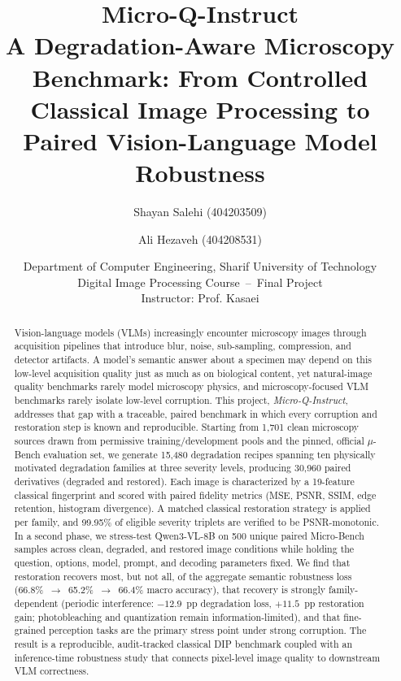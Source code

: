 \documentclass[11pt]{article}
\title{\vspace{-1.5cm}\textbf{\color{navy}Micro-Q-Instruct}\\[0.3em]
\large A Degradation-Aware Microscopy Benchmark: From Controlled Classical Image Processing to Paired Vision-Language Model Robustness}
\author{Shayan Salehi (404203509) \and Ali Hezaveh (404208531)}
\date{Department of Computer Engineering, Sharif University of Technology\\
Digital Image Processing Course \,--\, Final Project\\
Instructor: Prof. Kasaei}
\begin{document}
\maketitle
\thispagestyle{fancy}

\begin{abstract}
\noindent
Vision-language models (VLMs) increasingly encounter microscopy images through
acquisition pipelines that introduce blur, noise, sub-sampling, compression, and
detector artifacts. A model's semantic answer about a specimen may depend on this
low-level acquisition quality just as much as on biological content, yet natural-image
quality benchmarks rarely model microscopy physics, and microscopy-focused VLM
benchmarks rarely isolate low-level corruption. This project, \emph{Micro-Q-Instruct},
addresses that gap with a traceable, paired benchmark in which every corruption and
restoration step is known and reproducible. Starting from 1{,}701 clean microscopy
sources drawn from permissive training/development pools and the pinned, official
$\mu$-Bench evaluation set, we generate 15{,}480 degradation recipes spanning ten
physically motivated degradation families at three severity levels, producing 30{,}960
paired derivatives (degraded and restored). Each image is characterized by a
19-feature classical fingerprint and scored with paired fidelity metrics (MSE, PSNR,
SSIM, edge retention, histogram divergence). A matched classical restoration strategy
is applied per family, and 99.95\% of eligible severity triplets are verified to be
PSNR-monotonic. In a second phase, we stress-test Qwen3-VL-8B on 500 unique paired
Micro-Bench samples across clean, degraded, and restored image conditions while
holding the question, options, model, prompt, and decoding parameters fixed. We find
that restoration recovers most, but not all, of the aggregate semantic robustness loss
(66.8\%~$\to$~65.2\%~$\to$~66.4\% macro accuracy), that recovery is strongly
family-dependent (periodic interference: $-12.9$~pp degradation loss, $+11.5$~pp
restoration gain; photobleaching and quantization remain information-limited), and
that fine-grained perception tasks are the primary stress point under strong
corruption. The result is a reproducible, audit-tracked classical DIP benchmark
coupled with an inference-time robustness study that connects pixel-level image
quality to downstream VLM correctness.
\end{abstract}

\tableofcontents
\newpage

\end{document}
